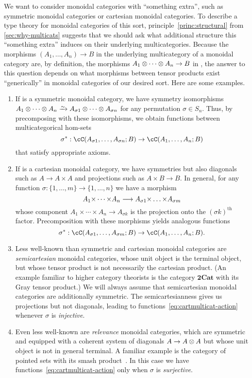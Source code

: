 We want to consider monoidal categories with ``something extra'', such as symmetric monoidal categories or cartesian monoidal categories.
To describe a type theory for monoidal categories of this sort, principle~\eqref{princ:structural} from \cref{sec:why-multicats} suggests that we should ask what additional structure this ``something extra'' induces on their underlying multicategories.
Because the morphisms $(A_1,\dots,A_n) \to B$ in the underlying multicategory of a monoidal category \cC are, by definition, the morphisms $A_1\otimes\cdots\otimes A_n \to B$ in \cC, the answer to this question depends on what morphisms between tensor products exist ``generically'' in monoidal categories of our desired sort.
Here are some examples.
\begin{enumerate}
\item If \cC is a symmetric monoidal category, we have symmetry isomorphisms $A_1\tensor\cdots\tensor A_n\toiso A_{\sigma 1}\tensor\cdots\tensor A_{\sigma n}$ for any permutation $\sigma\in S_n$.
  Thus, by precomposing with these isomorphisms, we obtain functions between multicategorical hom-sets
  \begin{equation}
    \sigma^*: \cC(A_{\sigma 1},\dots,A_{\sigma n}; B) \to \cC(A_1,\dots,A_n;B)\label{eq:symm-multicat-action}
  \end{equation}
  that satisfy appropriate axioms.
\item If \cC is a cartesian monoidal category, we have symmetries but also diagonals such as $A\to A\times A$ and projections such as $A\times B \to B$.
  In general, for any function $\sigma : \{1,\dots,m\} \to \{1,\dots,n\}$ we have a morphism
  \[ A_1\times \cdots\times A_n \too A_{\sigma 1} \times\dots\times A_{\sigma m} \]
  whose component $A_1\times \cdots\times A_n \to A_{\sigma k}$ is the projection onto the $(\sigma k)^{\mathrm{th}}$ factor.
  Precomposition with these morphisms yields analogous functions
  \begin{equation}
    \sigma^*: \cC(A_{\sigma 1},\dots,A_{\sigma m}; B) \to \cC(A_1,\dots,A_n;B).\label{eq:cartmulticat-action}
  \end{equation}
\item Less well-known than symmetric and cartesian monoidal categories are \emph{semicartesian} monoidal categories, whose unit object is the terminal object, but whose tensor product is not necessarily the cartesian product.
  (An example familiar to higher category theorists is the category $\mathbf{2Cat}$ with its Gray tensor product.)
  We will always assume that semicartesian monoidal categories are additionally symmetric.
  The semicartesianness gives us projections but not diagonals, leading to functions~\eqref{eq:cartmulticat-action} whenever $\sigma$ is \emph{injective}.
\item Even less well-known are \emph{relevance} monoidal categories, which are symmetric and equipped with a coherent system of diagonals $A \to A\otimes A$ but whose unit object is not in general terminal.
  A familiar example is the category of pointed sets with its smash product~\cite{dp:relevant-cats}.
  In this case we have functions~\eqref{eq:cartmulticat-action} only when $\sigma$ is \emph{surjective}.
\end{enumerate}

